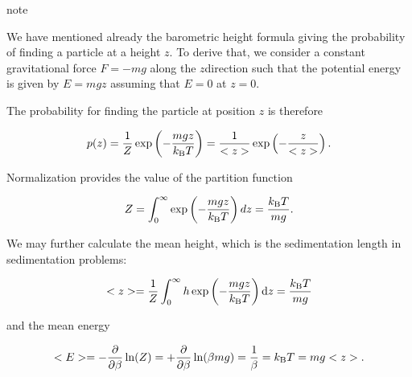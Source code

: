 \documentclass[letterpaper,10pt,english]{sphinxmanual}
\begin{document}
\begin{sphinxadmonition}{note}{}\unskip
\sphinxAtStartPar
{}

\sphinxAtStartPar
We have mentioned already the barometric height formula giving the probability of finding a particle at a height \(z\). To derive that, we consider a constant gravitational force \(F=-mg\) along the \(z\)\sphinxhyphen{}direction such that the potential energy is given by \(E=mgz\) assuming that \(E=0\) at \(z=0\).

\sphinxAtStartPar
The probability for finding the particle at position \(z\) is therefore

\sphinxAtStartPar
\begin{equation}
p(z)=\frac{1}{Z}\exp\left( -\frac{mgz}{k_{\rm B} T}\right)=\frac{1}{<z>}\exp\left ( -\frac{z}{<z>}\right ).
\end{equation}

\sphinxAtStartPar
Normalization provides the value of the partition function

\sphinxAtStartPar
\begin{equation}
Z=\int_0^\infty\exp\left( -\frac{mgz}{k_{\rm B} T}\right)dz=\frac{k_{\rm B}T}{mg}.
\end{equation}

\sphinxAtStartPar
We may further calculate the mean height, which is the sedimentation length in sedimentation problems:

\sphinxAtStartPar
\begin{equation}
<z>=\frac{1}{Z}\int_0^\infty h\exp\left( -\frac{mgz}{k_{\rm B} T}\right)\mathrm{d}z=\frac{k_{\rm B}T}{mg}
\end{equation}

\sphinxAtStartPar
and the mean energy

\sphinxAtStartPar
\begin{equation}
<E>=-\frac{\partial }{\partial \beta} \ln (Z)=+\frac{\partial}{\partial \beta}\ln(\beta m g)=\frac{1}{\beta}=k_{\rm B} T=mg <z>.
\end{equation}
\end{sphinxadmonition}
\end{document}
